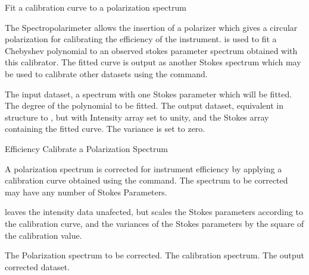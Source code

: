 \begin{manroutinedescription}
        Fit a calibration curve to a polarization spectrum

        The {} Spectropolarimeter allows the insertion of a polarizer
        which gives a {} circular polarization for calibrating %
the
        efficiency of the instrument. {} is used to fit a %
Chebyshev
        polynomial to an observed stokes parameter spectrum obtained
        with this calibrator. The fitted curve is output as another
        Stokes spectrum which may be used to calibrate other datasets
        using the {} command.

\begin{manparametertable}
  The input %
dataset, a spectrum with one
                               Stokes parameter which will be fitted.
  The degree of the polynomial %
to be fitted.
  The %
output dataset, equivalent in structure
                               to {}, but with Intensity array %
set to
                               unity, and the Stokes array containing
                               the fitted curve. The variance is set to
                               zero.

\end{manparametertable}
\end{manroutinedescription}
\begin{manroutinedescription}
        Efficiency Calibrate a Polarization Spectrum

        A polarization spectrum is corrected for instrument efficiency
        by applying a calibration curve obtained using the {}
        command. The spectrum to be corrected may have any number
        of Stokes Parameters.

        {} leaves the intensity data unafected, but scales the
        Stokes parameters according to the calibration curve, and the
        variances of the Stokes parameters by the square of the calibration
        value.

\begin{manparametertable}
  The %
Polarization spectrum to be corrected.
  The %
calibration spectrum.
  The %
output corrected dataset.

\end{manparametertable}
\end{manroutinedescription}
